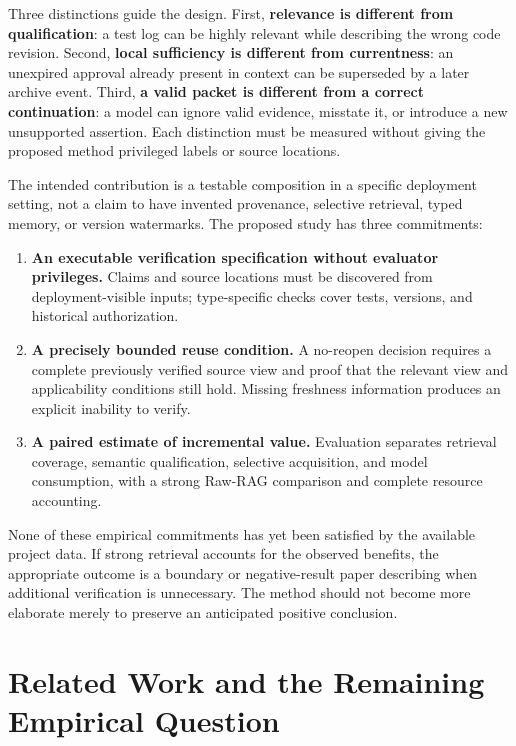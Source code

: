 Three distinctions guide the design. First, \textbf{relevance is
different from qualification}: a test log can be highly relevant while
describing the wrong code revision. Second, \textbf{local sufficiency is
different from currentness}: an unexpired approval already present in
context can be superseded by a later archive event. Third, \textbf{a
valid packet is different from a correct continuation}: a model can
ignore valid evidence, misstate it, or introduce a new unsupported
assertion. Each distinction must be measured without giving the proposed
method privileged labels or source locations.

The intended contribution is a testable composition in a specific
deployment setting, not a claim to have invented provenance, selective
retrieval, typed memory, or version watermarks. The proposed study has
three commitments:

\begin{enumerate}
\def\labelenumi{\arabic{enumi}.}
\tightlist
\item
  \textbf{An executable verification specification without evaluator
  privileges.} Claims and source locations must be discovered from
  deployment-visible inputs; type-specific checks cover tests, versions,
  and historical authorization.
\item
  \textbf{A precisely bounded reuse condition.} A no-reopen decision
  requires a complete previously verified source view and proof that the
  relevant view and applicability conditions still hold. Missing
  freshness information produces an explicit inability to verify.
\item
  \textbf{A paired estimate of incremental value.} Evaluation separates
  retrieval coverage, semantic qualification, selective acquisition, and
  model consumption, with a strong Raw-RAG comparison and complete
  resource accounting.
\end{enumerate}

None of these empirical commitments has yet been satisfied by the
available project data. If strong retrieval accounts for the observed
benefits, the appropriate outcome is a boundary or negative-result paper
describing when additional verification is unnecessary. The method
should not become more elaborate merely to preserve an anticipated
positive conclusion.

\section{Related Work and the Remaining Empirical
Question}\label{related-work-and-the-remaining-empirical-question}

